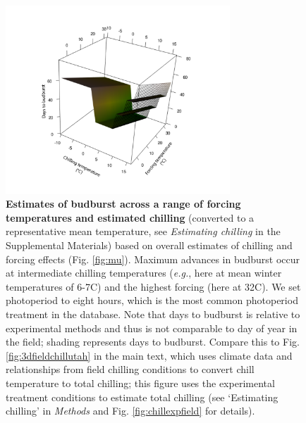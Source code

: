 \documentclass{article}
\begin{document}
 \begin{figure}[h!]
 \centering
 \noindent \includegraphics[width=0.75\textwidth]{..//..//analyses/bb_analysis/figures/bbmod_3dplot_utah.pdf}
 \caption{\textbf{Estimates of budburst across a range of forcing temperatures and estimated chilling} (converted to a representative mean temperature, see \emph{Estimating chilling} in the Supplemental Materials) based on overall estimates of chilling and forcing effects (Fig. \ref{fig:mu}). Maximum advances in budburst occur at intermediate chilling temperatures (\emph{e.g.}, here at mean winter temperatures of 6-7\degree C) and the highest forcing (here at 32\degree C). We set photoperiod to eight hours, which is the most common photoperiod treatment in the database. Note that days to budburst is relative to experimental methods and thus is not comparable to day of year in the field; shading represents days to budburst. Compare this to Fig. \ref{fig:3dfieldchillutah} in the main text, which uses climate data and relationships from field chilling conditions to convert chill temperature to total chilling; this figure uses the experimental treatment conditions to estimate total chilling (see `Estimating chilling' in \emph{Methods} and Fig. \ref{fig:chillexpfield} for details).} 
 \label{fig:3dexpchillutah}
 \end{figure}
 \newpage
\end{document}
